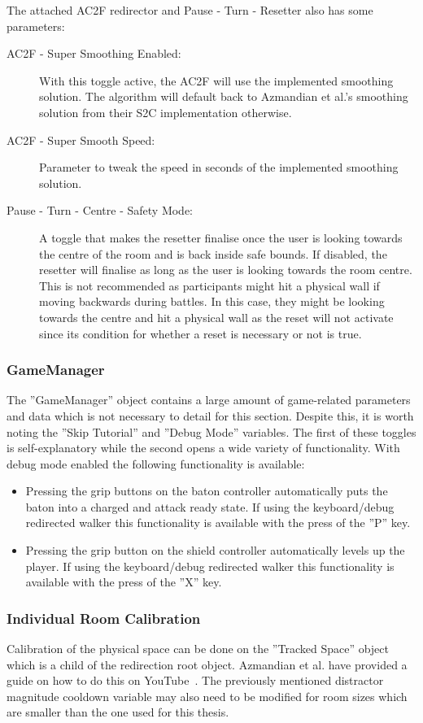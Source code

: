 The attached AC2F redirector and Pause - Turn - Resetter also has some parameters:
\begin{description}
   \item[AC2F - Super Smoothing Enabled:] With this toggle active, the AC2F will use the implemented smoothing solution. The algorithm will default back to Azmandian et al.'s smoothing solution from their S2C implementation otherwise. 
   \item[AC2F - Super Smooth Speed:] Parameter to tweak the speed in seconds of the implemented smoothing solution.
   \item[Pause - Turn - Centre - Safety Mode:] A toggle that makes the resetter finalise once the user is looking towards the centre of the room and is back inside safe bounds. If disabled, the resetter will finalise as long as the user is looking towards the room centre. This is not recommended as participants might hit a physical wall if moving backwards during battles. In this case, they might be looking towards the centre and hit a physical wall as the reset will not activate since its condition for whether a reset is necessary or not is true. 
\end{description}

\subsubsection{GameManager}
The ''GameManager'' object contains a large amount of game-related parameters and data which is not necessary to detail for this section. Despite this, it is worth noting the ''Skip Tutorial'' and ''Debug Mode'' variables. The first of these toggles is self-explanatory while the second opens a wide variety of functionality. With debug mode enabled the following functionality is available:

\begin{itemize}
    \item Pressing the grip buttons on the baton controller automatically puts the baton into a charged and attack ready state. If using the keyboard/debug redirected walker this functionality is available with the press of the ''P'' key.
    \item Pressing the grip button on the shield controller automatically levels up the player. If using the keyboard/debug redirected walker this functionality is available with the press of the ''X'' key.
\end{itemize}

\subsubsection{Individual Room Calibration}
Calibration of the physical space can be done on the ''Tracked Space'' object which is a child of the redirection root object. Azmandian et al. have provided a guide on how to do this on YouTube~\cite{toolkitSetup}. The previously mentioned distractor magnitude cooldown variable may also need to be modified for room sizes which are smaller than the one used for this thesis. 

